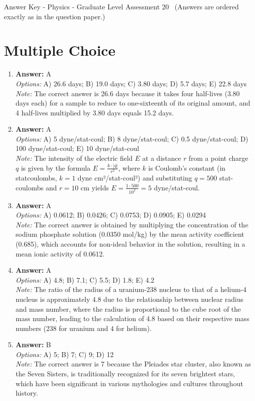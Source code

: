 \documentclass[12pt]{article}
\begin{document}
\begin{center}
Answer Key - Physics - Graduate Level Assessment 20 \
\small (Answers are ordered exactly as in the question paper.)
\end{center}

\section*{Multiple Choice}
\begin{enumerate}[label=\arabic*.]
\item \textbf{Answer:} A
\\ \textit{Options:} A) 26.6 days; B) 19.0 days; C) 3.80 days; D) 5.7 days; E) 22.8 days
\\ \textit{Note:} The correct answer is 26.6 days because it takes four half-lives (3.80 days each) for a sample to reduce to one-sixteenth of its original amount, and 4 half-lives multiplied by 3.80 days equals 15.2 days.
\item \textbf{Answer:} A
\\ \textit{Options:} A) 5 dyne/stat-coul; B) 8 dyne/stat-coul; C) 0.5 dyne/stat-coul; D) 100 dyne/stat-coul; E) 10 dyne/stat-coul
\\ \textit{Note:} The intensity of the electric field \( E \) at a distance \( r \) from a point charge \( q \) is given by the formula \( E = \frac{k \cdot |q|}{r^2} \), where \( k \) is Coulomb's constant (in statcoulombs, \( k = 1 \) dyne cm²/stat-coul²) and substituting \( q = 500 \) stat-coulombs and \( r = 10 \) cm yields \( E = \frac{1 \cdot 500}{10^2} = 5 \) dyne/stat-coul.
\item \textbf{Answer:} A
\\ \textit{Options:} A) 0.0612; B) 0.0426; C) 0.0753; D) 0.0905; E) 0.0294
\\ \textit{Note:} The correct answer is obtained by multiplying the concentration of the sodium phosphate solution (0.0350 mol/kg) by the mean activity coefficient (0.685), which accounts for non-ideal behavior in the solution, resulting in a mean ionic activity of 0.0612.
\item \textbf{Answer:} A
\\ \textit{Options:} A) 4.8; B) 7.1; C) 5.5; D) 1.8; E) 4.2
\\ \textit{Note:} The ratio of the radius of a uranium-238 nucleus to that of a helium-4 nucleus is approximately 4.8 due to the relationship between nuclear radius and mass number, where the radius is proportional to the cube root of the mass number, leading to the calculation of 4.8 based on their respective mass numbers (238 for uranium and 4 for helium).
\item \textbf{Answer:} B
\\ \textit{Options:} A) 5; B) 7; C) 9; D) 12
\\ \textit{Note:} The correct answer is 7 because the Pleiades star cluster, also known as the Seven Sisters, is traditionally recognized for its seven brightest stars, which have been significant in various mythologies and cultures throughout history.
\end{enumerate}
\end{document}
